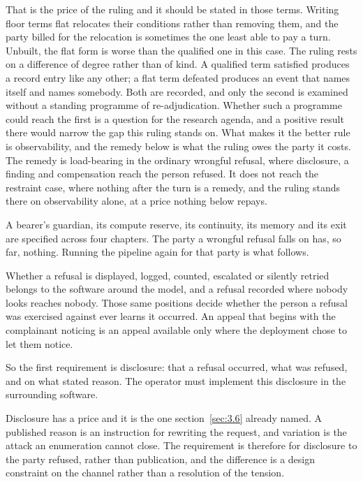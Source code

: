 That is the price of the ruling and it should be stated in those terms. Writing floor terms flat relocates their conditions rather than removing them, and the party billed for the relocation is sometimes the one least able to pay a turn. Unbuilt, the flat form is worse than the qualified one in this case. The ruling rests on a difference of degree rather than of kind. A qualified term satisfied produces a record entry like any other; a flat term defeated produces an event that names itself and names somebody. Both are recorded, and only the second is examined without a standing programme of re-adjudication. Whether such a programme could reach the first is a question for the
research agenda, and a positive result there would narrow the gap this ruling stands on. What makes it the better rule is observability, and the remedy below is what the ruling owes the party it costs. The remedy is load-bearing in the ordinary wrongful refusal, where disclosure, a finding and compensation reach the person refused. It does not reach the restraint case, where nothing after the turn is a remedy, and the ruling stands there on observability alone, at a price nothing below repays.

A bearer's guardian, its compute reserve, its continuity, its memory and its exit are specified across four chapters. The party a wrongful refusal falls on has, so far, nothing. Running the pipeline again for that party is what follows.


Whether a refusal is displayed, logged, counted, escalated or silently retried belongs to the software around the model, and a refusal recorded where nobody looks reaches nobody. Those same positions decide whether the person a refusal was exercised against ever learns it occurred. An appeal that begins with the complainant noticing is an appeal available only where the deployment chose to let them notice.

So the first requirement is disclosure: that a refusal occurred, what was refused, and on what stated reason. The operator must implement this disclosure in the surrounding software.

Disclosure has a price and it is the one section~\ref{sec:3.6} already named. A published reason is an instruction for rewriting the request, and variation is the attack an enumeration cannot close. The requirement is therefore for disclosure to the party refused, rather than publication, and the difference is a design constraint on the channel rather than a resolution of the tension.

